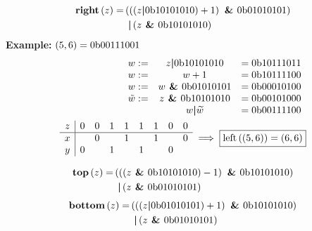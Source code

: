 \begin{frame}
    \begin{align}
        \textrm{\textbf{right}}\left(z\right) =& \left(\left(\left(
            z \textrm{\textbf{\textbar }} 0\textrm{b}10101010 \right) + 1 \right) \textrm{\textbf{ \& }} 0\textrm{b}01010101 \right)
            \nonumber \\
            &\;\,\textrm{\textbf{\textbar }} \left( z \textrm{\textbf{ \& }} 0\textrm{b}10101010 \right)
    \end{align}
    \textbf{Example:} $\left( 5, 6 \right) = 0\textrm{b}00111001$
    \begin{align}
        \begin{array}{c c c}
            w :=& z \textrm{\textbf{\textbar }} 0\textrm{b}10101010 &= 0\textrm{b}10111011 \\
            w :=& w + 1 &= 0\textrm{b}10111100 \\
            w :=& w \textrm{\textbf{ \& }} 0\textrm{b}01010101 &= 0\textrm{b}00010100 \\
            \tilde{w} :=& z \textrm{\textbf{ \& }} 0\textrm{b}10101010 &= 0\textrm{b}00101000 \\
            & w \textrm{\textbf{\textbar }} \widetilde{w} &= 0\textrm{b}00111100
        \end{array} \\
        \begin{array}{c | c c c c c c c c}
            z & 0 & 0 & 1 & 1 & 1 & 1 & 0 & 0 \\
            \hline
            x & & 0 & & 1 & & 1 & & 0 \\
            y & 0 & & 1 & & 1 & & 0 \\
        \end{array}
        \implies \boxed{\textrm{left}\left(\left(5, 6\right)\right) =
        \left(6, 6\right)}
    \end{align}
\end{frame}

\begin{frame}
    \begin{align}
        \textrm{\textbf{top}}\left(z\right) =& \left(\left(\left(z \textrm{\textbf{ \& }}
        0\textrm{b}10101010 \right) -1 \right) \textrm{\textbf{ \& }} 0\textrm{b}10101010 \right)
        \nonumber \\
        &\;\,\textrm{\textbf{\textbar }} \left( z \textrm{\textbf{ \& }}
        0\textrm{b}01010101 \right)
    \end{align}
    \begin{align}
        \textrm{\textbf{bottom}}\left(z\right) =& \left(\left(\left(z \textrm{\textbf{\textbar }}
        0\textrm{b}01010101 \right) +1 \right) \textrm{\textbf{ \& }} 0\textrm{b}10101010 \right)
        \nonumber \\
        &\;\,\textrm{\textbf{\textbar }} \left( z \textrm{\textbf{ \& }}
        0\textrm{b}01010101 \right)
    \end{align}
\end{frame}

